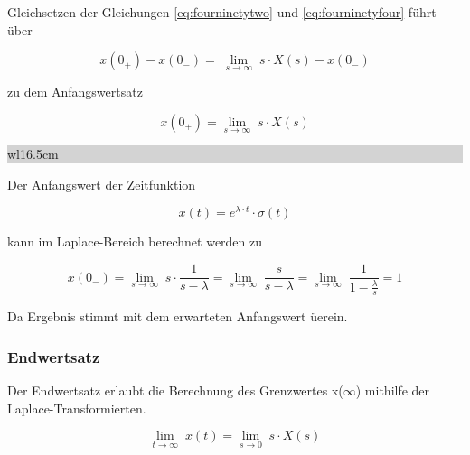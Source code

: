 \noindent Gleichsetzen der Gleichungen \eqref{eq:fourninetytwo} und \eqref{eq:fourninetyfour} führt über 

\begin{equation}\label{eq:fourninetyfive}
x\left(0_{+} \right)-x\left(0_{-} \right)=\;\lim\limits_{s\to \infty } \;s\cdot X\left(s\right)-x\left(0_{-} \right)
\end{equation}

\noindent zu dem Anfangswertsatz

\begin{equation}\label{eq:fourninetysix}
x\left(0_{+} \right)={\mathop{\lim }\limits_{s\to \infty }} \; s\cdot X\left(s\right)
\end{equation}\bigskip

\noindent
\colorbox{lightgray}{%
%
\renewcommand\arraystretch{0.6}%
\begin{tabular}{ wl{16.5cm} }
{\selectfont{Beispiel: Anfangswertsatz}}
\end{tabular}%
}\bigskip

\noindent Der Anfangswert der Zeitfunktion

\begin{equation}\label{eq:fourninetyseven}
x\left(t\right)=e^{\lambda \cdot t} \cdot \sigma \left(t\right)
\end{equation}

\noindent kann im Laplace-Bereich berechnet werden zu

\begin{equation}\label{eq:fourninetyeight}
x\left(0_{-} \right)=\lim\limits_{s\to \infty}\;s\cdot \frac{1}{s-\lambda } =\lim\limits_{s\to \infty} \;\frac{s}{s-\lambda } =\lim\limits_{s\to \infty} \;\frac{1}{1-\frac{\lambda }{s} } =1
\end{equation}

\noindent Da Ergebnis stimmt mit dem erwarteten Anfangswert üerein.

\subsubsection{Endwertsatz}

\noindent Der Endwertsatz erlaubt die Berechnung des Grenzwertes x($\infty$) mithilfe der Laplace-Transformierten.

\begin{equation}\label{eq:fourninetynine}
\lim \limits_{t\to \infty } \; x\left(t\right)=\lim \limits_{s\to 0} \; s\cdot X\left(s\right)
\end{equation}

